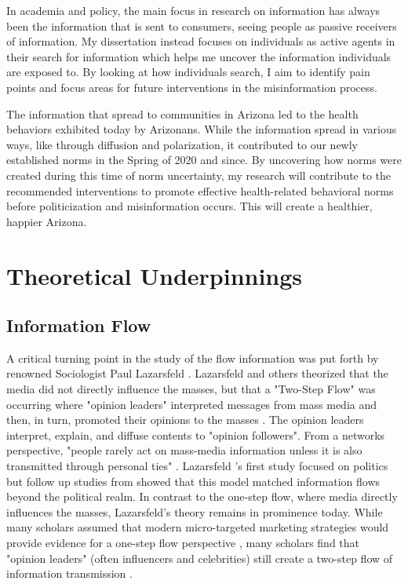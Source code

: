 In academia and policy, the main focus in research on information has always
been the information that is sent to consumers, seeing people as passive
receivers of information. My dissertation instead focuses on individuals as
active agents in their search for information which helps me uncover the
information individuals are exposed to. By looking at how individuals search, I
aim to identify pain points and focus areas for future interventions in the
misinformation process.

The information that spread to communities in Arizona led to the health
behaviors exhibited today by Arizonans. While the information spread in various
ways, like through diffusion and polarization, it contributed to our newly
established norms in the Spring of 2020 and since. By uncovering how norms were
created during this time of norm uncertainty, my research will contribute to the
recommended interventions to promote effective health-related behavioral norms
before politicization and misinformation occurs. This will create a healthier,
happier Arizona.

\section{Theoretical Underpinnings}

\subsection{Information Flow}
A critical turning point in the study of the flow information was put forth by
renowned Sociologist Paul Lazarsfeld \citeyearpar{lazarsfeldPeopleChoice1944}.
Lazarsfeld and others theorized that the media did not directly influence the
masses, but that a "Two-Step Flow" was occurring where "opinion leaders"
interpreted messages from mass media and then, in turn, promoted their opinions
to the masses \citep{katzPersonalInfluencePart1955}. The opinion leaders
interpret, explain, and diffuse contents to "opinion followers". From a networks
perspective, "people rarely act on mass-media information unless it is also
transmitted through personal ties" \citep[p. 1374]{granovetterStrengthWeakTies1973}. 
Lazarsfeld \citeyearpar{lazarsfeldPeopleChoice1944}'s first study focused on
politics but follow up studies from \citep{katzPersonalInfluencePart1955} showed
that this model matched information flows beyond the political realm. In
contrast to the one-step flow, where media directly influences the masses,
Lazarsfeld's theory remains in prominence today. While many scholars assumed
that modern micro-targeted marketing strategies would provide evidence for a
one-step flow perspective \citep{bennettOneStepFlowCommunication2006}, many
scholars find that "opinion leaders" (often influencers and celebrities) still
create a two-step flow of information transmission \citep{choi15,
hilbertOneStepTwo2017}.

